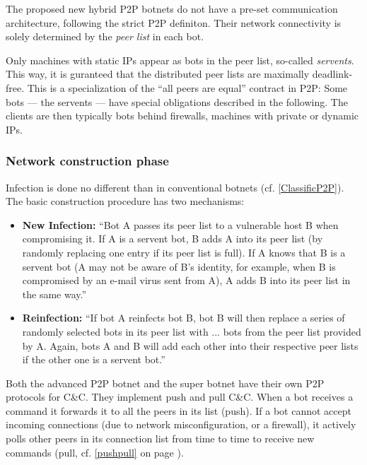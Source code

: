 \documentclass{llncs}
\begin{document}
The proposed new hybrid P2P botnets do not have a pre-set
communication architecture, following the strict P2P definiton. Their
network connectivity is solely determined by the {\it peer list} in
each bot.

Only machines with static IPs appear as bots in the peer list,
so-called {\it servents}.\cite{td1sc} This way, it is guranteed that
the distributed peer lists are maximally deadlink-free.  This is a
specialization of the ``all peers are equal'' contract in P2P: Some
bots --- the servents --- have special obligations described in the
following.  The clients are then typically bots behind firewalls,
machines with private or dynamic IPs.

\subsubsection{Network construction phase}

Infection is done no different than in conventional botnets
(cf. \ref{ClassificP2P}). The basic construction procedure has two
mechanisms:
\begin{itemize}
\item {\bf New Infection:} ``Bot A passes its peer list to a
vulnerable host B when compromising it. If A is a
servent bot, B adds A into its peer list (by randomly
replacing one entry if its peer list is full). If A knows
that B is a servent bot (A may not be aware of
B’s identity, for example, when B is compromised by
an e-mail virus sent from A), A adds B into its peer
list in the same way.'' \cite{td1sc}
\item {\bf Reinfection:} ``If bot A
reinfects bot B, bot B will then replace \lbrack{}a series of\rbrack{} 
 randomly selected bots in its peer list with \lbrack{}...\rbrack{} bots
from the peer list provided by A. Again, bots A and B
will add each other into their respective peer lists if
the other one is a servent bot.''\cite{td1sc}
\end{itemize}

Both the advanced P2P botnet and the super botnet have their own P2P
protocols for C\&C. They implement push and pull
C\&C.\cite{wang2009systematic} When a bot receives a command it
forwards it to all the peers in its list (push). If a bot cannot
accept incoming connections (due to network misconfiguration, or a
firewall), it actively polls other peers in its connection list from
time to time to receive new commands (pull, cf. \ref{pushpull} on page
\pageref{pushpull}).
\end{document}
